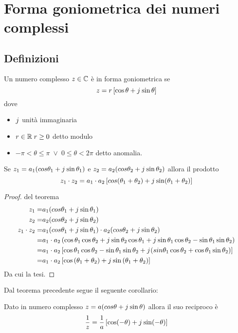 \chapter{Forma goniometrica dei numeri complessi}
\section{Definizioni}
\begin{defn}
	Un numero complesso $z\in\mathbb{C}$ è in forma goniometrica se
	\[z=r\left[\cos\theta+j\mkern1mu\sin\theta \right] \] dove
	\begin{itemize}
		\item $j\mkern1mu$ unità immaginaria
		\item $r\in\mathbb{R}\; r\geq 0$ detto modulo
		\item $-\pi <\theta\leq\pi\; \vee\; 0\leq\theta<2\pi$ detto anomalia.
	\end{itemize}
\end{defn}
\begin{thm}[Prodotto]\label{thm:Compl_Prodotto}
Se $z_1=a_1(cos\theta_1+j\mkern1mu\sin\theta_1)$ e $z_2=a_2(cos\theta_2+j\mkern1mu\sin\theta_2)$ allora il prodotto \[z_1\cdot z_2=a_1\cdot a_2\left[cos(\theta_1+\theta_2)+j\mkern1mu\sin(\theta_1+\theta_2)\right] \] 
\end{thm}
\begin{proof} del teorema
	\begin{align*}
	z_1=&a_1(cos\theta_1+j\mkern1mu\sin\theta_1)\\
	z_2=&a_2(cos\theta_2+j\mkern1mu\sin\theta_2)\\
	z_1\cdot z_2=&a_1(cos\theta_1+j\mkern1mu\sin\theta_1)\cdot a_2(cos\theta_2+j\mkern1mu\sin\theta_2)\\
	=&a_1\cdot a_2\left(\cos\theta_1\cos\theta_2+j\mkern1mu\sin\theta_2\cos\theta_1+j\mkern1mu\sin\theta_1\cos\theta_2-\sin\theta_1\sin\theta_2\right)\\
	=&a_1\cdot a_2\left[\cos\theta_1\cos\theta_2-\sin\theta_1\sin\theta_2+j\mkern1mu(sin\theta_1\cos\theta_2+\cos\theta_1\sin\theta_2)\right]\\
	=&a_1\cdot a_2\left[\cos\left(\theta_1+\theta_2\right)+j\mkern1mu\sin\left(\theta_1+\theta_2\right)\right]
	\end{align*}
	Da cui la tesi.
\end{proof}
Dal teorema precedente segue il seguente corollario:
\begin{cor}[Reciproco]\label{cor:Complex:reciproco}
	Dato in numero complesso $z=a(cos\theta+j\mkern1mu\sin\theta)$ allora il suo reciproco è \begin{equation*}
	\dfrac{1}{z}=\dfrac{1}{a}\left[\cos (-\theta)+j\mkern1mu\sin(-\theta)\right]
	\end{equation*}\label{equa:Compl_reciproco}
\end{cor}
